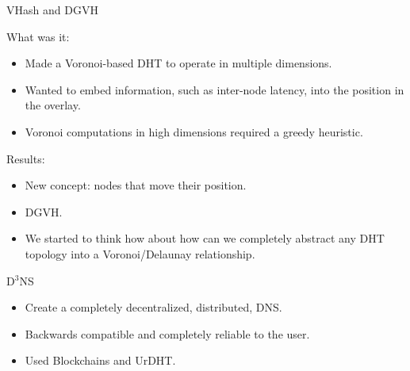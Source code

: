 \documentclass[11pt]{beamer}
\begin{document}


\begin{frame}{VHash and DGVH}



What was it:
\begin{itemize}
	\item Made a Voronoi-based DHT to operate in multiple dimensions.
	\item Wanted to embed information, such as inter-node latency, into the position in the overlay.
	\item Voronoi computations in high dimensions required a greedy heuristic.
\end{itemize}


Results:
\begin{itemize}
	\item New concept: nodes that move their position.
	\item DGVH.
	\item We started to think how about how can we completely abstract any DHT topology into a Voronoi/Delaunay relationship.
\end{itemize}

\end{frame}


\begin{frame}{D$^3$NS}

\begin{itemize}
	\item Create a completely decentralized, distributed, DNS.
	\item Backwards compatible and completely reliable to the user.
	\item Used Blockchains and UrDHT.
\end{itemize}
\end{frame}
\end{document}
